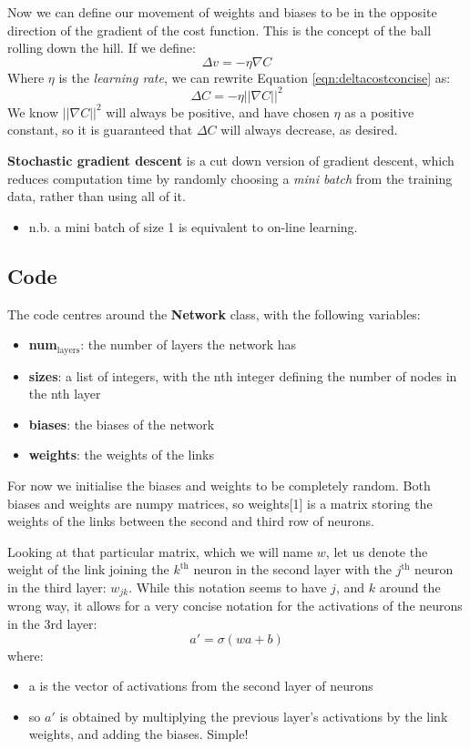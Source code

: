 \documentclass[11pt]{article}
\begin{document}
Now we can define our movement of weights and biases to be in the opposite direction of the gradient
of the cost function. This is the concept of the ball rolling down the hill. If we define:
\begin{equation}
\Delta v = - \eta \nabla C
\end{equation}
Where \(\eta\) is the \emph{learning rate}, we can rewrite Equation \ref{eqn:deltacostconcise} as:
\begin{equation}
\Delta C = - \eta ||\nabla C||^2
\end{equation}
We know \(||\nabla C||^2\) will always be positive, and have chosen \(\eta\) as a positive constant, so it 
is guaranteed that \(\Delta C\) will always decrease, as desired.

\textbf{Stochastic gradient descent} is a cut down version of gradient descent, which reduces computation time by 
randomly choosing a \emph{mini batch} from the training data, rather than using all of it.
\begin{itemize}
\item n.b. a mini batch of size 1 is equivalent to on-line learning.
\end{itemize}

\subsection{Code}
\label{sec:org5ef75ad}
The code centres around the \textbf{Network} class, with the following variables:
\begin{itemize}
\item \textbf{num\(_{\text{layers}}\)}: the number of layers the network has
\item \textbf{sizes}: a list of integers, with the nth integer defining the number of nodes in the nth layer
\item \textbf{biases}: the biases of the network
\item \textbf{weights}: the weights of the links
\end{itemize}
For now we initialise the biases and weights to be completely random. Both biases and weights are numpy matrices, so weights[1] is a matrix storing the weights of the links between the second and third row of neurons. 

Looking at that particular matrix, which we will name \(w\), let us denote the weight of the link joining the \(k^{\text{th}}\) neuron in the second layer with the \(j^{\text{th}}\) neuron in the third layer: \(w_{jk}\). While this notation seems to have \(j\), and \(k\) around the wrong way, it allows for a very concise notation for the activations of the neurons in the 3rd layer:
\begin{equation} \label{eqn:activation}
a' = \sigma ( wa+b )
\end{equation}
where:
\begin{itemize}
\item a is the vector of activations from the second layer of neurons
\item so \(a'\) is obtained by multiplying the previous layer's activations by the link weights, and adding the biases. Simple!
\end{itemize}
\end{document}

